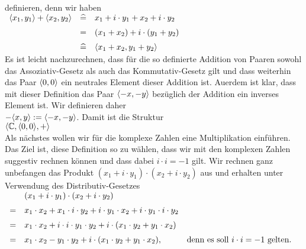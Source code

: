 \\[0.2cm]
definieren, denn wir haben
\\[0.2cm]
\hspace*{1.3cm}
$
\begin{array}[t]{lcl}
\pair(x_1,y_1) + \pair(x_2, y_2) & \widehat{=} & x_1 + i \cdot y_1 + x_2 + i \cdot y_2 \\[0.2cm]
                                & =           & (x_1 + x_2) + i \cdot (y_1 + y_2)     \\[0.2cm]
                                & \widehat{=} & \pair(x_1 + x_2, y_1 + y_2)
\end{array}
$
\\[0.2cm]
Es ist leicht nachzurechnen, dass f\"{u}r die so definierte Addition von Paaren
sowohl das Assoziativ-Gesetz als auch das Kommutativ-Gesetz gilt und dass weiterhin das
Paar $\pair(0,0)$ ein neutrales Element 
dieser Addition ist.  Au\3erdem ist klar, dass mit dieser Definition das Paar
$\pair(-x,-y)$ bez\"{u}glich der Addition ein inverses Element ist.  Wir definieren daher
\\[0.2cm]
\hspace*{1.3cm}
$-\pair(x,y) := \pair(-x,-y)$.
Damit ist die Struktur
\\[0.2cm]
\hspace*{1.3cm}
$\langle \mathbb{C}, \pair(0,0), + \rangle$
\\[0.2cm]
Als n\"{a}chstes wollen wir f\"{u}r die komplexe Zahlen eine Multiplikation einf\"{u}hren.   Das Ziel ist, 
diese Definition so zu w\"{a}hlen, dass wir mit den komplexen Zahlen suggestiv rechnen k\"{o}nnen
und dass dabei $i \cdot i = -1$ gilt.  Wir rechnen ganz unbefangen das Produkt 
$(x_1 + i \cdot y_1) \cdot (x_2 + i \cdot y_2)$ aus und erhalten unter Verwendung des
Distributiv-Gesetzes 
\\[0.2cm]
\hspace*{1.3cm}
$
\begin{array}[t]{cll}
  & (x_1 + i \cdot y_1) \cdot (x_2 + i \cdot y_2) \\[0.2cm]
= & x_1 \cdot x_2 + x_1 \cdot i \cdot y_2 + i \cdot y_1 \cdot x_2 + i \cdot y_1 \cdot i \cdot y_2
    \\[0.2cm]
= & x_1 \cdot x_2 + i \cdot i \cdot y_1 \cdot y_2 + i \cdot (x_1 \cdot y_2 + y_1 \cdot x_2) \\[0.2cm]
= & x_1 \cdot x_2 - y_1 \cdot y_2 + i \cdot (x_1 \cdot y_2 + y_1 \cdot x_2),
  & \mbox{denn es soll $i \cdot i = -1$ gelten.} 
\end{array}
$
\\[0.2cm]
